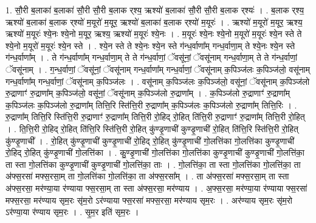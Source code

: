 \documentclass[17pt]{extarticle}
\begin{document}
1. सौ॒री ब॒लाका॑ ब॒लाका॑ सौ॒री सौ॒री ब॒लाक र्‌श्य॒ ऋश्यो॑ ब॒लाका॑ सौ॒री सौ॒री ब॒लाक र्‌श्यः॑ । . ब॒लाक र्‌श्य॒ ऋश्यो॑ ब॒लाका॑ ब॒लाक र्‌श्यो॑ म॒यूरो॑ म॒यूर॒ ऋश्यो॑ ब॒लाका॑ ब॒लाक र्‌श्यो॑ म॒यूरः॑ । . ऋश्यो॑ म॒यूरो॑ म॒यूर॒ ऋश्य॒ ऋश्यो॑ म॒यूरः॑ श्ये॒नः श्ये॒नो म॒यूर॒ ऋश्य॒ ऋश्यो॑ म॒यूरः॑ श्ये॒नः । . म॒यूरः॑ श्ये॒नः श्ये॒नो म॒यूरो॑ म॒यूरः॑ श्ये॒न स्ते ते श्ये॒नो म॒यूरो॑ म॒यूरः॑ श्ये॒न स्ते । . श्ये॒न स्ते ते श्ये॒नः श्ये॒न स्ते ग॑न्ध॒र्वाणा᳚म् गन्ध॒र्वाणा॒म् ते श्ये॒नः श्ये॒न स्ते ग॑न्ध॒र्वाणा᳚म् । . ते ग॑न्ध॒र्वाणा᳚म् गन्ध॒र्वाणा॒म् ते ते ग॑न्ध॒र्वाणां॒ ॅवसू॑नां॒ ॅवसू॑नाम् गन्ध॒र्वाणा॒म् ते ते ग॑न्ध॒र्वाणां॒ ॅवसू॑नाम् । . ग॒न्ध॒र्वाणां॒ ॅवसू॑नां॒ ॅवसू॑नाम् गन्ध॒र्वाणा᳚म् गन्ध॒र्वाणां॒ ॅवसू॑नाम् क॒पिञ्ज॑लः क॒पिञ्ज॑लो॒ वसू॑नाम् गन्ध॒र्वाणा᳚म् गन्ध॒र्वाणां॒ ॅवसू॑नाम् क॒पिञ्ज॑लः । . वसू॑नाम् क॒पिञ्ज॑लः क॒पिञ्ज॑लो॒ वसू॑नां॒ ॅवसू॑नाम् क॒पिञ्ज॑लो रु॒द्राणाꣳ॑ रु॒द्राणा᳚म् क॒पिञ्ज॑लो॒ वसू॑नां॒ ॅवसू॑नाम् क॒पिञ्ज॑लो रु॒द्राणा᳚म् । . क॒पिञ्ज॑लो रु॒द्राणाꣳ॑ रु॒द्राणा᳚म् क॒पिञ्ज॑लः क॒पिञ्ज॑लो रु॒द्राणा᳚म् तित्ति॒रि स्ति॑त्ति॒री रु॒द्राणा᳚म् क॒पिञ्ज॑लः क॒पिञ्ज॑लो रु॒द्राणा᳚म् तित्ति॒रिः । . रु॒द्राणा᳚म् तित्ति॒रि स्ति॑त्ति॒री रु॒द्राणाꣳ॑ रु॒द्राणा᳚म् तित्ति॒री रो॒हिद् रो॒हित् ति॑त्ति॒री रु॒द्राणाꣳ॑ रु॒द्राणा᳚म् तित्ति॒री रो॒हित् । . ति॒त्ति॒री रो॒हिद् रो॒हित् ति॑त्ति॒रि स्ति॑त्ति॒री रो॒हित् कु॑ण्डृ॒णाची॑ कुण्डृ॒णाची॑ रो॒हित् ति॑त्ति॒रि स्ति॑त्ति॒री रो॒हित् कु॑ण्डृ॒णाची᳚ । . रो॒हित् कु॑ण्डृ॒णाची॑ कुण्डृ॒णाची॑ रो॒हिद् रो॒हित् कु॑ण्डृ॒णाची॑ गो॒लत्ति॑का गो॒लत्ति॑का कुण्डृ॒णाची॑ रो॒हिद् रो॒हित् कु॑ण्डृ॒णाची॑ गो॒लत्ति॑का । . कु॒ण्डृ॒णाची॑ गो॒लत्ति॑का गो॒लत्ति॑का कुण्डृ॒णाची॑ कुण्डृ॒णाची॑ गो॒लत्ति॑का॒ ता स्ता गो॒लत्ति॑का कुण्डृ॒णाची॑ कुण्डृ॒णाची॑ गो॒लत्ति॑का॒ ताः । . गो॒लत्ति॑का॒ ता स्ता गो॒लत्ति॑का गो॒लत्ति॑का॒ ता अ॑फ्स॒रसा॑ मफ्स॒रसा॒म् ता गो॒लत्ति॑का गो॒लत्ति॑का॒ ता अ॑फ्स॒रसा᳚म् । . ता अ॑फ्स॒रसा॑ मफ्स॒रसा॒म् ता स्ता अ॑फ्स॒रसा॒ मर॑ण्या॒या र॑ण्याया फ्स॒रसा॒म् ता स्ता अ॑फ्स॒रसा॒ मर॑ण्याय । . अ॒फ्स॒रसा॒ मर॑ण्या॒या र॑ण्याया फ्स॒रसा॑ मफ्स॒रसा॒ मर॑ण्याय सृम॒रः सृ॑म॒रो ऽर॑ण्याया फ्स॒रसा॑ मफ्स॒रसा॒ मर॑ण्याय सृम॒रः । . अर॑ण्याय सृम॒रः सृ॑म॒रो ऽर॑ण्या॒या र॑ण्याय सृम॒रः । . सृ॒म॒र इति॑ सृम॒रः । \newline
\pagebreak
{}
\end{document}
